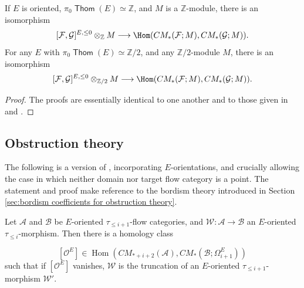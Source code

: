 \documentclass{TPmod}
\def\bZ{\mathbb{Z}}
\DeclareMathOperator{\Thom}{\mathsf{Thom}}
\newcommand{\cA}{\mathcal{A}}
\newcommand{\cB}{\mathcal{B}}
\newcommand{\cF}{\mathcal{F}}
\newcommand{\cG}{\mathcal{G}}
\newcommand{\cO}{\mathcal{O}}
\newcommand{\cW}{\mathcal{W}}
\def\bZ{\mathbb{Z}}
\renewcommand{\cong}{\simeq}
\numberwithin{equation}{section}
\begin{document}
\begin{lem} \label{lem:truncation to morse complexes}
If $E$ is oriented, $\pi_0\Thom(E) \cong \bZ$, and $M$ is a $\bZ$-module,
    there is an isomorphism 
    \[
    [\cF,\cG]^{E,\leq 0} \otimes_{\bZ} M \longrightarrow \Hom(CM_*(\cF;M), CM_*(\cG;M)).
    \]
    For any $E$ with $\pi_0\Thom(E) \cong \bZ/2$, and any $\bZ/2$-module $M$, 
    there is an isomorphism 
    \[
    [\cF,\cG]^{E,\leq 0} \otimes_{\bZ/2} M \longrightarrow \Hom(CM_*(\cF;M), CM_*(\cG;M)).
    \]
\end{lem}

\begin{proof}
    The proofs are essentially identical to one another and to those given in \cite[Lemma 5.41]{PS} and \cite[Lemma 5.25]{PS2}.
\end{proof}

\subsection{Obstruction theory }\label{sec: ob thry}
  


The following is a version of \cite[Theorem 5.48]{PS}, incorporating $E$-orientations, and crucially allowing the case in which neither domain nor target flow category is a point. The statement and proof make reference to the bordism theory introduced in Section \ref{sec:bordism coefficients for obstruction theory}.


    \begin{prop}\label{prop: lift ob}
        Let $\cA$ and $\cB$ be $E$-oriented $\tau_{\leq i+1}$-flow categories, and $\cW: \cA \to \cB$ an $E$-oriented $\tau_{\leq i}$-morphism. Then there is a homology class

        \begin{equation}\label{eq: lift ob}
            [\cO^E] \in \operatorname{Hom}\left(CM_{*+i+2}(\cA), CM_*(\cB; \Omega^{E}_{i+1})\right)
        \end{equation}
        such that if $[\cO^E]$ vanishes, $\cW$ is the truncation of an $E$-oriented $\tau_{\leq i+1}$-morphism $\cW'$.
    
    \end{prop}
\end{document}
